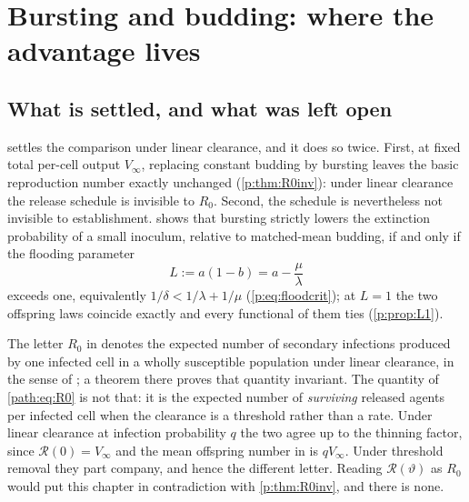 
\section{Bursting and budding: where the advantage lives}
\label{path:sec:selection}

\subsection{What is settled, and what was left open}
\label{path:sec:settled}

\ChPopcap{} settles the comparison under linear clearance, and it does so
twice. First, at fixed total per-cell output $V_\infty$, replacing constant
budding by bursting leaves the basic reproduction number exactly unchanged
(\cref{p:thm:R0inv}): under linear clearance the release schedule is
invisible to $R_0$. Second, the schedule is nevertheless not invisible to
establishment.  shows that bursting strictly lowers the
extinction probability of a small inoculum, relative to matched-mean
budding, if and only if the flooding parameter
\begin{equation}
L:=a(1-b)=a-\frac{\mu}{\lambda}
\label{path:eq:L}
\end{equation}
exceeds one, equivalently $1/\delta<1/\lambda+1/\mu$
(\cref{p:eq:floodcrit}); at $L=1$ the two offspring laws coincide exactly
and every functional of them ties (\cref{p:prop:L1}).

The letter $R_0$ in \ChPop{} denotes the expected number of secondary
infections produced by one infected cell in a wholly susceptible population
under linear clearance, in the sense of \cite{diekmann1990definition}; a
theorem there proves that quantity invariant. The quantity of
\cref{path:eq:R0} is not that: it is the expected number of \emph{surviving}
released agents per infected cell when the clearance is a threshold rather
than a rate. Under linear clearance at infection probability $q$ the two
agree up to the thinning factor, since $\mathcal{R}(0)=V_\infty$ and the
mean offspring number in \ChPop{} is $qV_\infty$. Under threshold removal
they part company, and hence the different letter. Reading
$\mathcal{R}(\vartheta)$ as $R_0$ would put this chapter in contradiction
with \cref{p:thm:R0inv}, and there is none.


